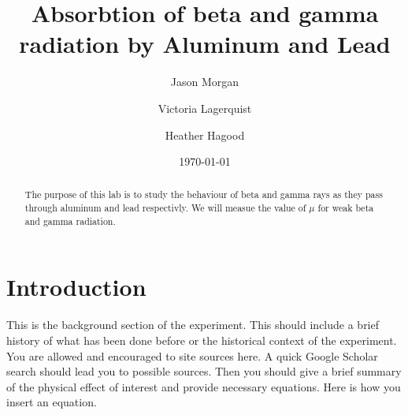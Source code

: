 \documentclass[twocolumn,secnumarabic,amssymb, nobibnotes, aps, pra]{revtex4}
\begin{document}
\title{Absorbtion of beta and gamma radiation by Aluminum and Lead
 }


\author{Jason Morgan}

\author{Victoria Lagerquist}

\author{Heather Hagood}



\date{\today}


\begin{abstract}

The purpose of this lab is to study the behaviour of beta and gamma rays as they pass through aluminum and lead respectivly. We will measue the value of $\mu$ for weak beta and gamma radiation.

\end{abstract}

\maketitle
\section{Introduction}

This is the background section of the experiment.  This should include a brief history of what has been done before or the historical context of the experiment. You are allowed and encouraged to site sources here.  A quick Google Scholar search should lead you to possible sources. Then you should give a brief summary of the physical effect of interest and provide necessary equations. Here is how you insert an equation. 
\end{document}
